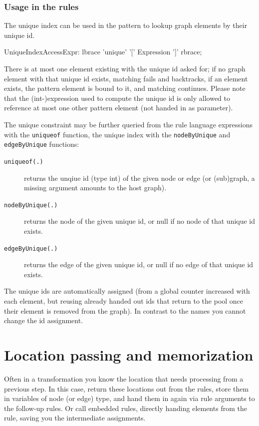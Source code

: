 \subsubsection*{Usage in the rules}
The unique index can be used in the pattern to lookup graph elements by their unique id.

\begin{rail}
  UniqueIndexAccessExpr:
    lbrace 'unique' '[' Expression ']' rbrace;
\end{rail}

There is at most one element existing with the unique id asked for; if no graph element with that unique id exists, matching fails and backtracks, if an element exists, the pattern element is bound to it, and matching continues.
Please note that the (int-)expression used to compute the unique id is only allowed to reference at most one other pattern element (not handed in as parameter).

The unique constraint may be further queried from the rule language expressions with the \texttt{uniqueof} function,
the unique index with the \texttt{nodeByUnique} and \texttt{edgeByUnique} functions:
\begin{description}
\item[\texttt{uniqueof(.)}] returns the unqiue id (type int) of the given node or edge (or (sub)graph, a missing argument amounts to the host graph).
\item[\texttt{nodeByUnique(.)}] returns the node of the given unique id, or null if no node of that unique id exists.
\item[\texttt{edgeByUnique(.)}] returns the edge of the given unique id, or null if no edge of that unique id exists.
\end{description}

The unique ids are automatically assigned (from a global counter increased with each element, but reusing already handed out ids that return to the pool once their element is removed from the graph). In contrast to the names you cannot change the id assignment.


\section{Location passing and memorization}
Often in a transformation you know the location that needs processing from a previous step.
In this case, return these locations out from the rules, store them in variables of node (or edge) type, and hand them in again via rule arguments to the follow-up rules.
Or call embedded rules, directly handing elements from the rule, saving you the intermediate assignments.

